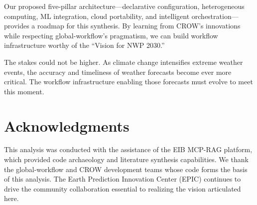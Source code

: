 \documentclass[11pt,twocolumn]{article}
\begin{document}
Our proposed five-pillar architecture---declarative configuration, heterogeneous computing, ML integration, cloud portability, and intelligent orchestration---provides a roadmap for this synthesis. By learning from CROW's innovations while respecting global-workflow's pragmatism, we can build workflow infrastructure worthy of the ``Vision for NWP 2030.''

The stakes could not be higher. As climate change intensifies extreme weather events, the accuracy and timeliness of weather forecasts become ever more critical. The workflow infrastructure enabling those forecasts must evolve to meet this moment.

\section*{Acknowledgments}

This analysis was conducted with the assistance of the EIB MCP-RAG platform, which provided code archaeology and literature synthesis capabilities. We thank the global-workflow and CROW development teams whose code forms the basis of this analysis. The Earth Prediction Innovation Center (EPIC) continues to drive the community collaboration essential to realizing the vision articulated here.
\end{document}

